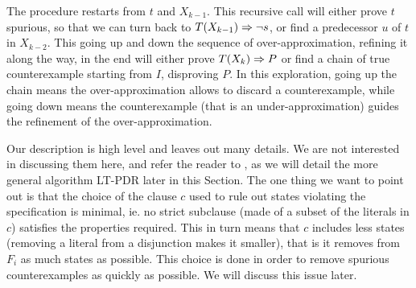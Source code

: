 The procedure restarts from $t$ and $X_{k-1}$. This recursive call will either prove $t$ spurious, so that we can turn back to $T(X_{k-1}) \Rightarrow \lnot s$, or find a predecessor $u$ of $t$ in $X_{k-2}$. This going up and down the sequence of over-approximation, refining it along the way, in the end will either prove $T(X_k) \Rightarrow P$ or find a chain of true counterexample starting from $I$, disproving $P$.
In this exploration, going up the chain means the over-approximation allows to discard a counterexample, while going down means the counterexample (that is an under-approximation) guides the refinement of the over-approximation.

Our description is high level and leaves out many details. We are not interested in discussing them here, and refer the reader to \cite{Bradley11}, as we will detail the more general algorithm LT-PDR later in this Section. The one thing we want to point out is that the choice of the clause $c$ used to rule out states violating the specification is minimal, ie. no strict subclause (made of a subset of the literals in $c$) satisfies the properties required. This in turn means that $c$ includes less states (removing a literal from a disjunction makes it smaller), that is it removes from $F_i$ as much states as possible. This choice is done in order to remove spurious counterexamples as quickly as possible. We will discuss this issue later.

